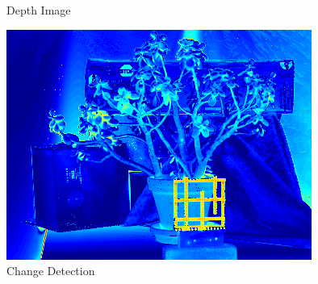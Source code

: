 \documentclass{beamer}
\begin{document}
\begin{frame}
\begin{figure}[ht]
\begin{minipage}[b]{0.3\linewidth}
      \caption{Depth Image}
    \end{minipage}
    \begin{minipage}[b]{0.3\linewidth}
      \centering
      \includegraphics[width=\textwidth]{./JadePlant/ChangesYtoX.png}
      \caption{Change Detection}
    \end{minipage}
  \end{figure}
\end{frame}

\end{document}
